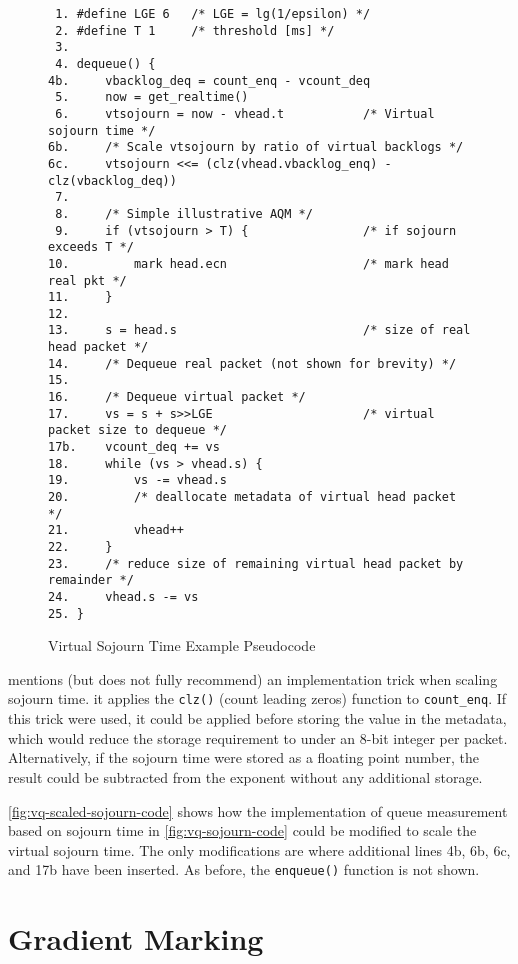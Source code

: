 \begin{figure*}
\small
\begin{verbatim}
 1. #define LGE 6   /* LGE = lg(1/epsilon) */
 2. #define T 1     /* threshold [ms] */
 3. 
 4. dequeue() {
4b.     vbacklog_deq = count_enq - vcount_deq
 5.     now = get_realtime()
 6.     vtsojourn = now - vhead.t           /* Virtual sojourn time */
6b.     /* Scale vtsojourn by ratio of virtual backlogs */
6c.     vtsojourn <<= (clz(vhead.vbacklog_enq) - clz(vbacklog_deq))
 7.
 8.     /* Simple illustrative AQM */
 9.     if (vtsojourn > T) {                /* if sojourn exceeds T */
10.         mark head.ecn                   /* mark head real pkt */
11.     }
12. 
13.     s = head.s                          /* size of real head packet */
14.     /* Dequeue real packet (not shown for brevity) */
15.
16.     /* Dequeue virtual packet */
17.     vs = s + s>>LGE                     /* virtual packet size to dequeue */ 
17b.    vcount_deq += vs
18.     while (vs > vhead.s) {
19.         vs -= vhead.s
20.         /* deallocate metadata of virtual head packet */
21.         vhead++
22.     }
23.     /* reduce size of remaining virtual head packet by remainder */
24.     vhead.s -= vs
25. }
\end{verbatim}
\caption{Virtual Sojourn Time Example Pseudocode}\label{fig:vq-scaled-sojourn-code}
\end{figure*}

\cite{Briscoe17b:sigqdyn_TR} mentions (but does not fully recommend) an implementation trick when scaling sojourn time. it applies the \texttt{clz()} (count leading zeros) function to \texttt{count\_enq}. If this trick were used, it could be applied before storing the value in the metadata, which would reduce the storage requirement to under an 8-bit integer per packet. Alternatively, if the sojourn time were stored as a floating point number, the result could be subtracted from the exponent without any additional storage.

\autoref{fig:vq-scaled-sojourn-code} shows how the implementation of queue measurement based on sojourn time in \autoref{fig:vq-sojourn-code} could be modified to scale the virtual sojourn time. The only modifications are where additional lines 4b, 6b, 6c, and 17b have been inserted. As before, the \texttt{enqueue()} function is not shown.


\section{Gradient Marking}\label{l4saqmtr_gradient}

